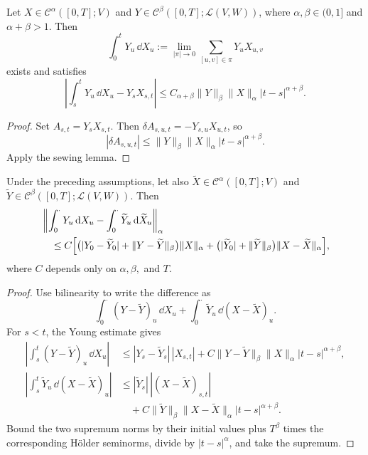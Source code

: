 \begin{prop}
Let $X\in\mathcal C^\alpha([0,T];V)$ and
$Y\in\mathcal C^\beta([0,T];\mathcal L(V,W))$, where
$\alpha,\beta\in(0,1]$ and $\alpha+\beta>1$.  Then
\[
  \int_0^tY_u\,\dd X_u
  :=\lim_{|\pi|\to0}\sum_{[u,v]\in\pi}Y_uX_{u,v}
\]
exists and satisfies
\[
  \left|\int_s^tY_u\,\dd X_u-Y_sX_{s,t}\right|
  \le C_{\alpha+\beta}\|Y\|_\beta\|X\|_\alpha
      |t-s|^{\alpha+\beta}.
\]
\end{prop}

\begin{proof}
Set $A_{s,t}=Y_sX_{s,t}$.  Then
$\delta A_{s,u,t}=-Y_{s,u}X_{u,t}$, so
\[
  |\delta A_{s,u,t}|
  \le\|Y\|_\beta\|X\|_\alpha|t-s|^{\alpha+\beta}.
\]
Apply the sewing lemma.
\end{proof}

\begin{prop}
Under the preceding assumptions, let also
$\widetilde X\in\mathcal C^\alpha([0,T];V)$ and
$\widetilde Y\in\mathcal C^\beta([0,T];\mathcal L(V,W))$.  Then
\begin{align*}
 &\left\|\int_0^\cdot Y_u\,\mathrm{d} X_u
       -\int_0^\cdot\widetilde Y_u\,\mathrm{d}\widetilde X_u\right\|_\alpha\\
 &\quad\le C
 \Bigl[
  \bigl(|Y_0-\widetilde Y_0|+\|Y-\widetilde Y\|_\beta\bigr)\|X\|_\alpha
  +\bigl(|\widetilde Y_0|+\|\widetilde Y\|_\beta\bigr)
   \|X-\widetilde X\|_\alpha
 \Bigr],
\end{align*}
where $C$ depends only on $\alpha,\beta,$ and $T$.
\end{prop}

\begin{proof}
Use bilinearity to write the difference as
\[
  \int_0^\cdot(Y-\widetilde Y)_u\,\dd X_u
  +\int_0^\cdot\widetilde Y_u\,\dd(X-\widetilde X)_u.
\]
For $s<t$, the Young estimate gives
\begin{align*}
\left|\int_s^t(Y-\widetilde Y)_u\,\dd X_u\right|
&\le |Y_s-\widetilde Y_s|\,|X_{s,t}|
 +C\|Y-\widetilde Y\|_\beta\|X\|_\alpha|t-s|^{\alpha+\beta},\\
\left|\int_s^t\widetilde Y_u\,\dd(X-\widetilde X)_u\right|
&\le |\widetilde Y_s|\,|(X-\widetilde X)_{s,t}|\\
&\quad+C\|\widetilde Y\|_\beta\|X-\widetilde X\|_\alpha
 |t-s|^{\alpha+\beta}.
\end{align*}
Bound the two supremum norms by their initial values plus $T^\beta$ times the
corresponding Hölder seminorms, divide by $|t-s|^\alpha$, and take the
supremum.
\end{proof}


